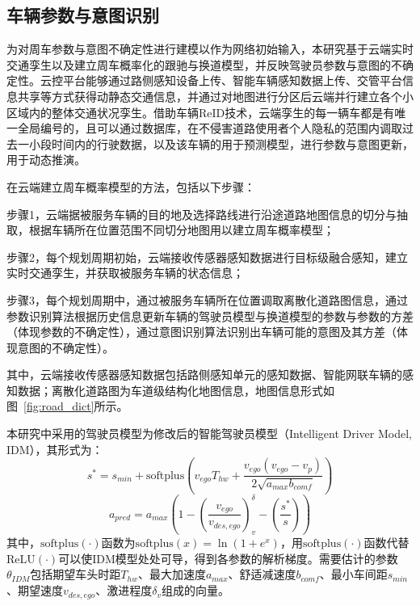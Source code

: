   \subsection{车辆参数与意图识别}
  \label{subsection:param_and_int_recog}
    为对周车参数与意图不确定性进行建模以作为网络初始输入，本研究基于云端实时交通孪生以及建立周车概率化的跟驰与换道模型，并反映驾驶员参数与意图的不确定性。云控平台能够通过路侧感知设备上传、智能车辆感知数据上传、交管平台信息共享等方式获得动静态交通信息，并通过对地图进行分区后云端并行建立各个小区域内的整体交通状况孪生。借助车辆ReID技术，云端孪生的每一辆车都是有唯一全局编号的，且可以通过数据库，在不侵害道路使用者个人隐私的范围内调取过去一小段时间内的行驶数据，以及该车辆的用于预测模型，进行参数与意图更新，用于动态推演。

    在云端建立周车概率模型的方法，包括以下步骤：

    步骤1，云端据被服务车辆的目的地及选择路线进行沿途道路地图信息的切分与抽取，根据车辆所在位置范围不同切分地图用以建立周车概率模型；

    步骤2，每个规划周期初始，云端接收传感器感知数据进行目标级融合感知，建立实时交通孪生，并获取被服务车辆的状态信息；

    步骤3，每个规划周期中，通过被服务车辆所在位置调取离散化道路图信息，通过参数识别算法根据历史信息更新车辆的驾驶员模型与换道模型的参数与参数的方差（体现参数的不确定性），通过意图识别算法识别出车辆可能的意图及其方差（体现意图的不确定性）。

    \noindent 其中，云端接收传感器感知数据包括路侧感知单元的感知数据、智能网联车辆的感知数据；离散化道路图为车道级结构化地图信息，地图信息形式如图~\ref{fig:road_dict}所示。

    本研究中采用的驾驶员模型为修改后的智能驾驶员模型（Intelligent Driver Model, IDM）\cite{IDM_2020}，其形式为：
    \begin{equation}
      s^\ast = s_{min} + \text{softplus} \left(v_{ego} T_{hw}+\frac{v_{ego}(v_{ego}-v_p)}{2\sqrt{a_{max}b_{comf}}}\right)
    \end{equation}
    \begin{equation}
      a_{pred} = a_{max} \left(1-\left(\frac{v_{ego}}{v_{des,ego}}\right)^\delta_v - \left(\frac{s^\ast}{s}\right)\right)
    \end{equation}
    \noindent 其中，$\text{softplus}(\cdot)$函数为$\text{softplus}(x) = \ln(1+e^x)$，用$\text{softplus}(\cdot)$函数代替$\text{ReLU}(\cdot)$可以使IDM模型处处可导，得到各参数的解析梯度。需要估计的参数$\theta_{IDM}$包括期望车头时距$T_{hw}$、最大加速度$a_{max}$、舒适减速度$b_{comf}$、最小车间距$s_{min}$、期望速度$v_{des,ego}$、激进程度$\delta_v$组成的向量。

